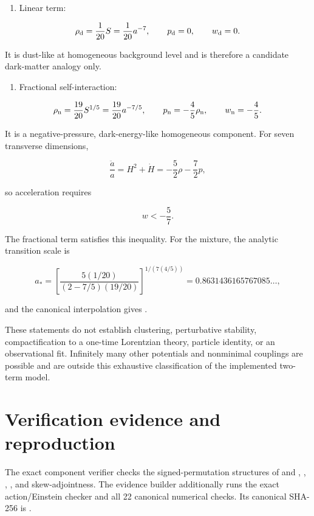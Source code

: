 \documentclass[11pt]{article}
\begin{document}
\begin{enumerate}
\item Linear term:
\end{enumerate}

\[
\rho_{\rm d}=\frac1{20}S=\frac1{20}a^{-7},
\qquad p_{\rm d}=0,
\qquad w_{\rm d}=0.
\]

It is dust-like at homogeneous background level and is therefore a candidate dark-matter analogy only.

\begin{enumerate}
\item Fractional self-interaction:
\end{enumerate}

\[
\rho_{\rm n}=\frac{19}{20}S^{1/5}
=\frac{19}{20}a^{-7/5},
\qquad p_{\rm n}=-\frac45\rho_{\rm n},
\qquad w_{\rm n}=-\frac45.
\]

It is a negative-pressure, dark-energy-like homogeneous component. For seven transverse dimensions,

\[
\frac{\ddot a}{a}=H^2+\dot H
=-\frac52\rho-\frac72p,
\]

so acceleration requires

\[
w< -\frac57.
\]

The fractional term satisfies this inequality. For the mixture, the analytic transition scale is

\[
a_*=\left[
\frac{5(1/20)}{(2-7/5)(19/20)}
\right]^{1/(7(4/5))}
=0.8631436165767085\ldots,
\]

and the canonical interpolation gives \texttt{}.

These statements do not establish clustering, perturbative stability, compactification to a one-time Lorentzian theory, particle identity, or an observational fit. Infinitely many other potentials and nonminimal couplings are possible and are outside this exhaustive classification of the implemented two-term model.

\section{Verification evidence and reproduction}

The exact component verifier checks the signed-permutation structures of \texttt{} and \texttt{}, \texttt{}, \texttt{}, \texttt{}, and skew-adjointness. The evidence builder additionally runs the exact action/Einstein checker and all 22 canonical numerical checks. Its canonical SHA-256 is \texttt{}.
\end{document}
